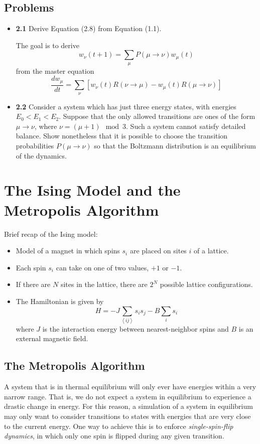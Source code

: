 \documentclass{article}
\begin{document}
\subsection{Problems}
\begin{itemize}
\item \textbf{2.1} Derive Equation (2.8) from Equation (1.1).

{
\color{red}
The goal is to derive
$$w_{\nu}(t+1) = \sum_{\mu}P(\mu \rightarrow \nu)w_{\mu}(t)$$
from the master equation
$$\frac{dw_{\mu}}{dt} = \sum_{\nu}[w_{\nu}(t)R(\nu \rightarrow \mu)
                              - w_{\mu}(t)R(\mu \rightarrow \nu)]$$
}

\item \textbf{2.2} Consider a system which has just three energy states, with energies
$E_{0} < E_{1} < E_{2}$. Suppose that the only allowed transitions are ones of the form
$\mu \rightarrow \nu$, where $\nu = (\mu + 1) \mod 3$. Such a system cannot satisfy
detailed balance. Show nonetheless that it is possible to choose the transition
probabilities $P(\mu \rightarrow \nu)$ so that the Boltzmann distribution is an
equilibrium of the dynamics.
\end{itemize}

\section{The Ising Model and the Metropolis Algorithm}
Brief recap of the Ising model:
\begin{itemize}
\item Model of a magnet in which spins $s_{i}$ are placed on sites $i$ of a lattice.
\item Each spin $s_{i}$ can take on one of two values, $+1$ or $-1$.
\item If there are $N$ sites in the lattice, there are $2^{N}$ possible lattice configurations.
\item The Hamiltonian is given by
$$H = -J\sum_{\left \langle ij \right \rangle}s_{i}s_{j} - B\sum_{i}s_{i}$$
where $J$ is the interaction energy between nearest-neighbor spins and $B$ is an external magnetic field.
\end{itemize}

\subsection{The Metropolis Algorithm}
A system that is in thermal equilibrium will only ever have energies within a very narrow range. That is,
we do not expect a system in equilibrium to experience a drastic change in energy. For this reason, a simulation
of a system in equilibrium may only want to consider transitions to states with energies that are very close
to the current energy. One way to achieve this is to enforce \emph{single-spin-flip dynamics}, in which only one spin
is flipped during any given transition.
\end{document}

